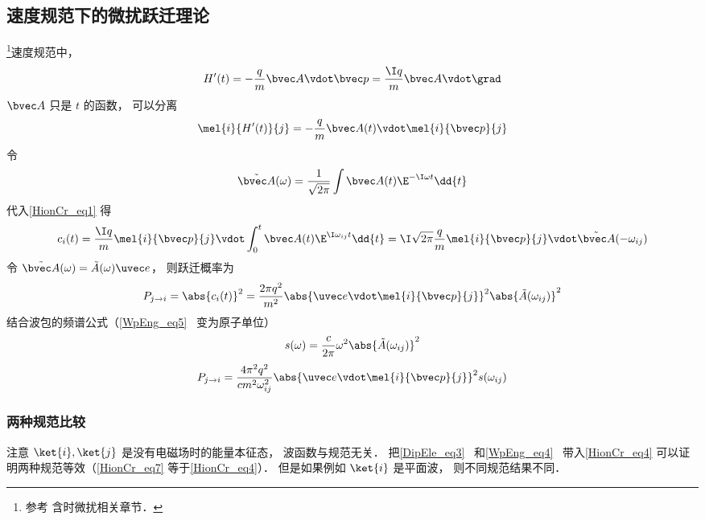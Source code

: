 \subsection{速度规范下的微扰跃迁理论}
\footnote{参考\cite{Merzbacher} 含时微扰相关章节．}速度规范中，
\begin{equation}
H'(t) = -\frac{q}{m}\bvec A \vdot \bvec p = \frac{\I q}{m}\bvec A \vdot \grad
\end{equation}
$\bvec A$ 只是 $t$ 的函数， 可以分离
\begin{equation}
\mel{i}{H'(t)}{j} = -\frac{q}{m}\bvec A(t) \vdot \mel{i}{\bvec p}{j}
\end{equation}
令
\begin{equation}
\tilde {\bvec A}(\omega) = \frac{1}{\sqrt{2\pi}} \int \bvec A(t) \E^{-\I\omega t} \dd{t}
\end{equation}
代入\autoref{HionCr_eq1} 得
\begin{equation}\label{HionCr_eq4}
c_i(t) = \frac{\I q}{m} \mel{i}{\bvec p}{j} \vdot \int_0^t  \bvec A(t) \E^{\I\omega_{ij} t} \dd{t} = \I\sqrt{2\pi}\frac{q}{m} \mel{i}{\bvec p}{j} \vdot \tilde {\bvec A}(-\omega_{ij})
\end{equation}
令 $\tilde {\bvec A}(\omega) = \tilde {A}(\omega)\uvec e$， 则跃迁概率为
\begin{equation}\label{HionCr_eq3}
P_{j\to i} = \abs{c_i(t)}^2 = \frac{2\pi q^2}{m^2} \abs{\uvec e \vdot\mel{i}{\bvec p}{j}}^2 \abs{\tilde {A}(\omega_{ij})}^2
\end{equation}
结合波包的频谱公式（\autoref{WpEng_eq5}~ 变为原子单位）
\begin{equation}
s(\omega) = \frac{c}{2\pi} \omega^2 \abs{\tilde {A}(\omega_{ij})}^2
\end{equation}
\begin{equation}\label{HionCr_eq5}
P_{j\to i} = \frac{4\pi^2 q^2}{c m^2 \omega_{ij}^2} \abs{\uvec e \vdot\mel{i}{\bvec p}{j}}^2 s(\omega_{ij})
\end{equation}

\subsubsection{两种规范比较}
注意 $\ket{i}, \ket{j}$ 是没有电磁场时的能量本征态， 波函数与规范无关． 把\autoref{DipEle_eq3}~ 和\autoref{WpEng_eq4}~ 带入\autoref{HionCr_eq4} 可以证明两种规范等效（\autoref{HionCr_eq7}  等于\autoref{HionCr_eq4}）． 但是如果例如 $\ket{i}$ 是平面波， 则不同规范结果不同．

